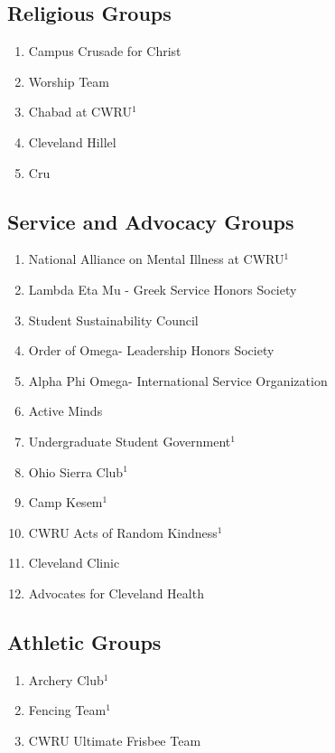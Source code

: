     \subsection*{Religious Groups}
      \begin{enumerate}
       \item Campus Crusade for Christ  
       \item Worship Team
       \item Chabad at CWRU$^1$
       \item Cleveland Hillel
       \item Cru
      \end{enumerate}
      
    \subsection*{Service and Advocacy Groups}
      \begin{enumerate}
	\item National Alliance on Mental Illness at CWRU$^1$
	\item Lambda Eta Mu - Greek Service Honors Society
	\item Student Sustainability Council
	\item Order of Omega- Leadership Honors Society
	\item Alpha Phi Omega- International Service Organization
	\item Active Minds
	\item Undergraduate Student Government$^1$
	\item Ohio Sierra Club$^1$
	\item Camp Kesem$^1$
	\item CWRU Acts of Random Kindness$^1$
	\item Cleveland Clinic
	\item Advocates for Cleveland Health
      \end{enumerate}
      
    \subsection*{Athletic Groups}
      \begin{enumerate}
       \item Archery Club$^1$
       \item Fencing Team$^1$
       \item CWRU Ultimate Frisbee Team
      \end{enumerate}
      

